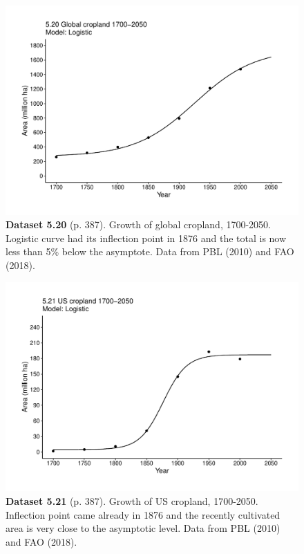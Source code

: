 \documentclass[aps,rmp,preprint,superscriptaddress,10pt,onecolumn]{article}
\begin{document}
\clearpage
\begin{figure}[h]
\includegraphics[width=\textwidth]{output/figs-ggplot/5.20.pdf}
\caption*{\textbf{Dataset 5.20} (p. 387). Growth of global cropland, 1700-2050. Logistic curve had its inflection point in 1876 and the total is now less than 5\% below the asymptote. Data from PBL (2010) and FAO (2018).}
\end{figure}
	
\clearpage
\begin{figure}[h]
\includegraphics[width=\textwidth]{output/figs-ggplot/5.21.pdf}
\caption*{\textbf{Dataset 5.21} (p. 387). Growth of US cropland, 1700-2050. Inflection point came already in 1876 and the recently cultivated area is very close to the asymptotic level. Data from PBL (2010) and FAO (2018).}
\end{figure}
	
\end{document}

